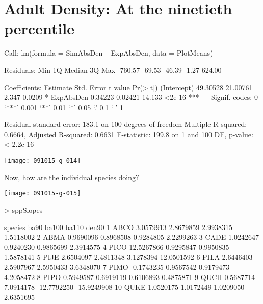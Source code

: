 \documentclass{article}
\begin{document}
\section{Adult Density: At the ninetieth percentile}
\begin{Schunk}
\begin{Soutput}
Call:
lm(formula = SimAbsDen ~ ExpAbsDen, data = PlotMeans)

Residuals:
    Min      1Q  Median      3Q     Max 
-760.57  -69.53  -46.39   -1.27  624.00 

Coefficients:
            Estimate Std. Error t value Pr(>|t|)    
(Intercept) 49.30528   21.00761   2.347   0.0209 *  
ExpAbsDen    0.34223    0.02421  14.133   <2e-16 ***
---
Signif. codes:  0 ‘***’ 0.001 ‘**’ 0.01 ‘*’ 0.05 ‘.’ 0.1 ‘ ’ 1

Residual standard error: 183.1 on 100 degrees of freedom
Multiple R-squared:  0.6664,	Adjusted R-squared:  0.6631 
F-statistic: 199.8 on 1 and 100 DF,  p-value: < 2.2e-16
\end{Soutput}
\end{Schunk}
\texttt{[image: 091015-g-014]}

Now, how are the individual species doing?

\texttt{[image: 091015-g-015]}
\begin{Schunk}
\begin{Sinput}
>   sppSlopes
\end{Sinput}
\begin{Soutput}
   species       ba90     ba100       ba110       den90
1     ABCO  3.0579913 2.8679859   2.9938315   1.5118002
2     ABMA  0.9690096 0.8968508   0.9284805   2.2299263
3     CADE  1.0242647 0.9240230   0.9865699   2.3914575
4     PICO 12.5267866 0.9295847   0.9950835   1.5878141
5     PIJE  2.6504097 2.4811348   3.1278394  12.0501592
6     PILA  2.6446403 2.5907967   2.5950433   3.6348070
7     PIMO -0.1743235 0.9567542   0.9179473   4.2058472
8     PIPO  0.5949587 0.6919119   0.6106893   0.4875871
9     QUCH  0.5687714 7.0914178 -12.7792250 -15.9249908
10    QUKE  1.0520175 1.0172449   1.0209050   2.6351695
\end{Soutput}
\end{Schunk}


\newpage
\end{document}
